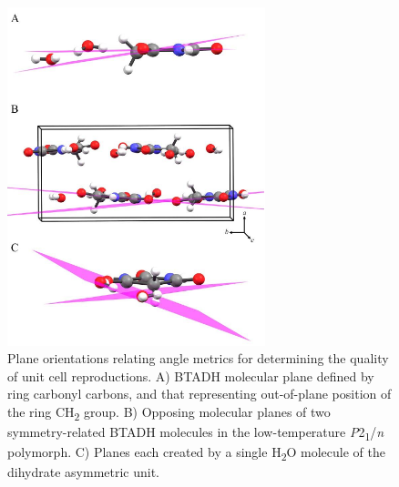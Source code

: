 \begin{figure}
  \center
  \includegraphics[width=7.5cm]{src/figures/btadh_figs/btdah_fig2.png}
  \caption{Plane orientations relating angle metrics for determining the quality of unit cell reproductions. A) BTADH molecular plane defined by ring carbonyl carbons, and that representing out-of-plane position of the ring CH\textsubscript{2} group. B) Opposing molecular planes of two symmetry-related BTADH molecules in the low-temperature \textit{P}2\textsubscript{1}/\textit{n} polymorph. C) Planes each created by a single H\textsubscript{2}O molecule of the dihydrate asymmetric unit.}
  \label{btadh_planeorientations}
\end{figure}

